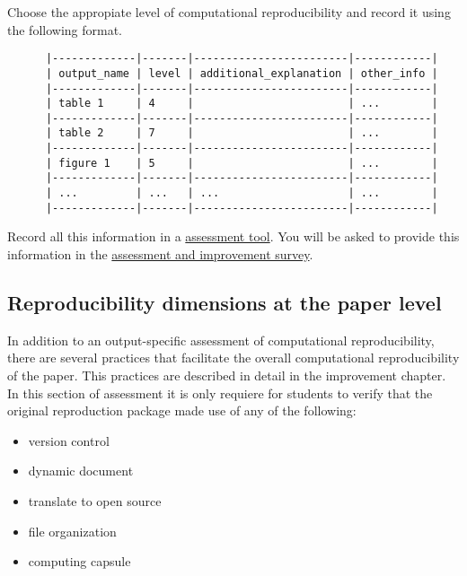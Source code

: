 \documentclass[]{book}
\providecommand{\tightlist}{%
  \setlength{\itemsep}{0pt}\setlength{\parskip}{0pt}}
\begin{document}
Choose the appropiate level of computational reproducibility and record it using the following format.

\begin{verbatim}
      |-------------|-------|------------------------|------------|
      | output_name | level | additional_explanation | other_info |
      |-------------|-------|------------------------|------------|
      | table 1     | 4     |                        | ...        |
      |-------------|-------|------------------------|------------|
      | table 2     | 7     |                        | ...        |
      |-------------|-------|------------------------|------------|
      | figure 1    | 5     |                        | ...        |
      |-------------|-------|------------------------|------------|
      | ...         | ...   | ...                    | ...        |
      |-------------|-------|------------------------|------------|
\end{verbatim}

Record all this information in a \href{https://docs.google.com/spreadsheets/d/1LUIdVFH0OfR70C7z07TYeE-uWzKI_JIeWUMaYhqEKK0/edit\#gid=1384504774\&range=A1}{assessment tool}. You will be asked to provide this information in the \href{ADD\%20LINK}{assessment and improvement survey}.

\hypertarget{reproducibility-dimensions-at-the-paper-level}{%
\subsection{Reproducibility dimensions at the paper level}\label{reproducibility-dimensions-at-the-paper-level}}

In addition to an output-specific assessment of computational reproducibility, there are
several practices that facilitate the overall computational reproducibility of the paper. This
practices are described in detail in the improvement chapter. In this section of assessment it is only
requiere for students to verify that the original reproduction package made use of any of the following:

\begin{itemize}
\tightlist
\item
  version control\\
\item
  dynamic document\\
\item
  translate to open source\\
\item
  file organization\\
\item
  computing capsule
\end{itemize}
\end{document}

